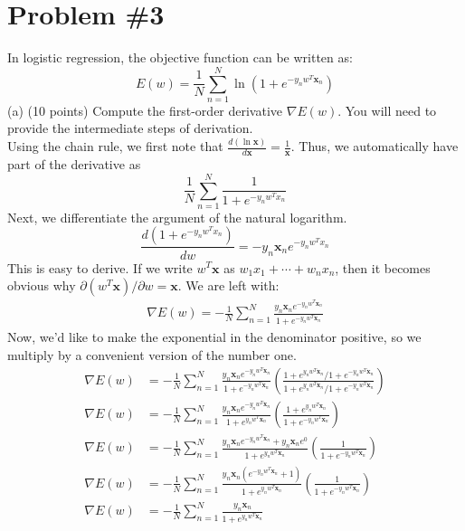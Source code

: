 \documentclass[12pt]{article}
\begin{document}
	\section*{Problem \#3}
	In logistic regression, the objective function can be written as:
	\begin{equation*}
	E(w)=\frac{1}{N} \sum_{n=1}^{N} \ln(1+e^{-y_nw^T\boldsymbol{x}_n})
	\end{equation*}
	(a) (10 points) Compute the first-order derivative $\nabla E(w)$. You will need to provide the intermediate steps of derivation.\\
	Using the chain rule, we first note that $\frac{d(\ln \boldsymbol{x})}{d\boldsymbol{x}} = \frac{1}{\boldsymbol{x}}$. Thus, we automatically have part of the derivative as
	\begin{equation*}
	\frac{1}{N} \sum_{n=1}^{N} \frac{1}{1+e^{-y_nw^Tx_n}}
	\end{equation*}
	Next, we differentiate the argument of the natural logarithm.
	\begin{equation*}
	\frac{d(1+e^{-y_nw^Tx_n})}{dw} = -y_n \boldsymbol{x}_n e^{-y_nw^Tx_n}
	\end{equation*}
	This is easy to derive. If we write $w^T \boldsymbol{x}$ as $w_1 x_1 + \cdots + w_n x_n$, then it becomes obvious why $\partial (w^T \boldsymbol{x}) / \partial w = \boldsymbol{x}$. We are left with:
	\begin{align*}
	\nabla E(w) = -\frac{1}{N} \sum_{n=1}^{N} \frac{y_n \boldsymbol{x}_n e^{-y_nw^T \boldsymbol{x}_n}}{1+e^{-y_nw^T \boldsymbol{x}_n}}
	\end{align*}
	Now, we'd like to make the exponential in the denominator positive, so we multiply by a convenient version of the number one.
	\begin{align*}
	\nabla E(w) &= -\frac{1}{N} \sum_{n=1}^{N} \frac{y_n \boldsymbol{x}_n e^{-y_nw^T\boldsymbol{x}_n}}{1+e^{-y_nw^T\boldsymbol{x}_n}} \left( \frac{1+e^{y_n w^T \boldsymbol{x}_n}/1+e^{-y_n w^T \boldsymbol{x}_n}}{1+e^{y_n w^T \boldsymbol{x}_n}/1+e^{-y_n w^T \boldsymbol{x}_n}}\right) \\	
	\nabla E(w) &= -\frac{1}{N} \sum_{n=1}^{N} \frac{y_n \boldsymbol{x}_n e^{-y_nw^T\boldsymbol{x}_n}}{1+e^{y_nw^T\boldsymbol{x}_n}} \left( \frac{1+e^{y_n w^T \boldsymbol{x}_n}}{1+e^{-y_n w^T \boldsymbol{x}_n}} \right) \\
	\nabla E(w) &= -\frac{1}{N} \sum_{n=1}^{N} \frac{y_n \boldsymbol{x}_n e^{-y_nw^T\boldsymbol{x}_n} + y_n \boldsymbol{x}_n e^0}{1+e^{y_nw^T\boldsymbol{x}_n}} \left( \frac{1}{1+e^{-y_n w^T \boldsymbol{x}_n}} \right) \\
	\nabla E(w) &= -\frac{1}{N} \sum_{n=1}^{N} \frac{y_n \boldsymbol{x}_n (e^{-y_nw^T\boldsymbol{x}_n} + 1)}{1+e^{y_nw^T\boldsymbol{x}_n}} \left( \frac{1}{1+e^{-y_n w^T \boldsymbol{x}_n}} \right) \\
	\nabla E(w) &= -\frac{1}{N} \sum_{n=1}^{N} \frac{y_n \boldsymbol{x}_n}{1+e^{y_nw^T\boldsymbol{x}_n}} 
	\end{align*}
\end{document}
